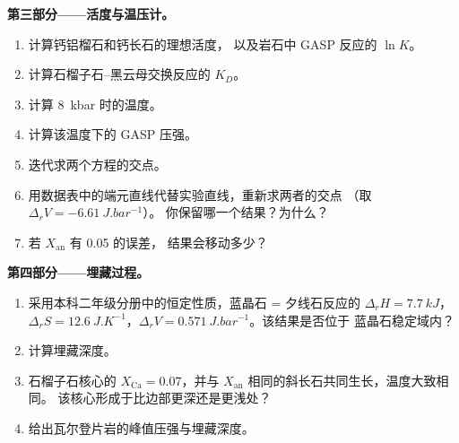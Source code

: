 \begin{problem}
\medskip\noindent\textbf{第三部分——活度与温压计。}
\begin{enumerate}[resume]
  \item 计算钙铝榴石和钙长石的理想活度，
        以及岩石中 GASP 反应的 $\ln K$。
  \item 计算石榴子石–黑云母交换反应的 $K_D$。
  \item 计算 \qty{8}{kbar} 时的温度。
  \item 计算该温度下的 GASP 压强。
  \item 迭代求两个方程的交点。
  \item 用数据表中的端元直线代替实验直线，重新求两者的交点
        （取 $\Delta_rV = \qty{-6.61}{J.bar^{-1}}$）。
        你保留哪一个结果？为什么？
  \item 若 $X_{\text{an}}$ 有 0.05 的误差，
        结果会移动多少？
\end{enumerate}

\medskip\noindent\textbf{第四部分——埋藏过程。}
\begin{enumerate}[resume]
  \item 采用本科二年级分册中的恒定性质，蓝晶石 = 夕线石反应的
        $\Delta_rH = \qty{7.7}{kJ}$，$\Delta_rS =
        \qty{12.6}{J.K^{-1}}$，$\Delta_rV = \qty{0.571}{J.bar^{-1}}$。该结果是否位于
        蓝晶石稳定域内？
  \item 计算埋藏深度。
  \item 石榴子石核心的 $X_{\text{Ca}} = 0.07$，并与
        $X_{\text{an}}$ 相同的斜长石共同生长，温度大致相同。
        该核心形成于比边部更深还是更浅处？
  \item 给出瓦尔登片岩的峰值压强与埋藏深度。
\end{enumerate}
\end{problem}
